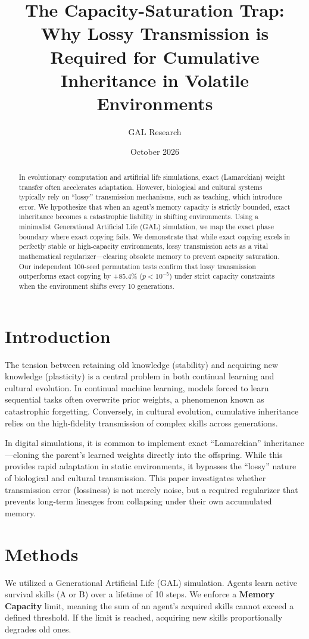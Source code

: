 \documentclass[11pt,a4paper]{article}
\title{The Capacity-Saturation Trap: Why Lossy Transmission is Required for Cumulative Inheritance in Volatile Environments}
\author{GAL Research}
\date{October 2026}
\begin{document}
\maketitle

\begin{abstract}
In evolutionary computation and artificial life simulations, exact (Lamarckian) weight transfer often accelerates adaptation. However, biological and cultural systems typically rely on ``lossy'' transmission mechanisms, such as teaching, which introduce error. We hypothesize that when an agent's memory capacity is strictly bounded, exact inheritance becomes a catastrophic liability in shifting environments. Using a minimalist Generational Artificial Life (GAL) simulation, we map the exact phase boundary where exact copying fails. We demonstrate that while exact copying excels in perfectly stable or high-capacity environments, lossy transmission acts as a vital mathematical regularizer---clearing obsolete memory to prevent capacity saturation. Our independent 100-seed permutation tests confirm that lossy transmission outperforms exact copying by +85.4\% ($p < 10^{-5}$) under strict capacity constraints when the environment shifts every 10 generations.
\end{abstract}

\section{Introduction}
The tension between retaining old knowledge (stability) and acquiring new knowledge (plasticity) is a central problem in both continual learning and cultural evolution. In continual machine learning, models forced to learn sequential tasks often overwrite prior weights, a phenomenon known as catastrophic forgetting. Conversely, in cultural evolution, cumulative inheritance relies on the high-fidelity transmission of complex skills across generations.

In digital simulations, it is common to implement exact ``Lamarckian'' inheritance---cloning the parent's learned weights directly into the offspring. While this provides rapid adaptation in static environments, it bypasses the ``lossy'' nature of biological and cultural transmission. This paper investigates whether transmission error (lossiness) is not merely noise, but a required regularizer that prevents long-term lineages from collapsing under their own accumulated memory.

\section{Methods}
We utilized a Generational Artificial Life (GAL) simulation. Agents learn active survival skills (A or B) over a lifetime of 10 steps. We enforce a \textbf{Memory Capacity} limit, meaning the sum of an agent's acquired skills cannot exceed a defined threshold. If the limit is reached, acquiring new skills proportionally degrades old ones.
\end{document}
